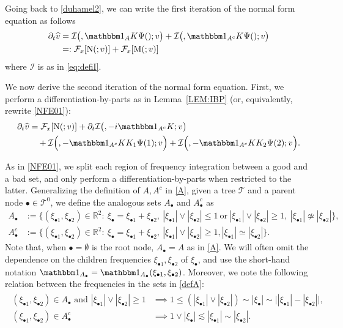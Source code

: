 \documentclass[%
11pt,  reqno]{amsart}
\makeatletter
\newcommand{\5}{\textup{V}}
\newcommand{\noi}{\noindent}
\newcommand{\ft}{\widehat}
\newcommand{\ind}{\mathbbm 1}
\newcommand{\les}{\lesssim}
\newcommand{\dt}{\partial_t}
\theoremstyle{remark}
\newcommand{\R}{\mathbb{R}}
\newcommand{\bul}{\bullet}
\newcommand{\TT}{\mathcal{T}}
\newcommand{\Ft}{{\mathcal{F}}}
\def\<#1>{\csname MH@symb@#1\endcsname}
\newcommand{\Ical}{\mathcal{I}}
\numberwithin{equation}{section}
\numberwithin{theorem}{section}
\newcommand{\MM}{\mathrm{M}}
\newcommand{\NN}{\mathrm{N}}
\makeatother
\begin{document}
Going back to \eqref{duhamel2}, we can write the first iteration of the normal form equation as follows
\begin{align}
\dt\ft v
&
= 
\Ical\big( \<1>, \ind_A K \Psi(\<1>); v 
\big)
+ \Ical\big( \<1>, \ind_{A^c} K \Psi(\<1>) ;v 
\big)
\\
&
=: \Ft_x[ \NN ( \<1>; v )] + \Ft_x[ \MM(\<1>; v) ] 
\label{NFE000}
\end{align}
where $\Ical$ is as in \eqref{eq:defiI}.

We now derive the second iteration of the normal form equation. 
First, we perform a differentiation-by-parts as in Lemma~\ref{LEM:IBP} (or, equivalently, rewrite \eqref{NFE01}):
\begin{align}
\label{NFE00}
\begin{split}
\dt\ft v 
&
=
 \Ft_x[ \NN ( \<1>; v )] 
+ 
\dt\Ical \big( \<1>,  - i \ind_{A^c} K; v \big) 
\\
&
\quad 
+
\Ical \Big( \<21>, - \ind_{A^c} KK_1\Psi(1) ; v  \Big) 
+
\Ical \Big( \<22>, - \ind_{A^c} KK_2\Psi(2) ; v  \Big) 
. 
\end{split}
\end{align}

\noi
As in \eqref{NFE01}, we split each region of frequency integration between a good and a bad set, and only perform a differentiation-by-parts when restricted to the latter. Generalizing the definition of $A, A^c$ in \eqref{A}, given a tree $\TT$ and a parent node $\bul \in \TT^0$, we define the analogous sets $A_\bul$ and $A_\bul^c$ as
\begin{align}
A_\bul& 
:=
 \big\{ (\xi_{\bul1}, \xi_{\bul2}) \in \R^2: \ \xi_\bul =
\xi_{\bul1}
+ \xi_{\bul2}, \ |\xi_{\bul1}| \lor  |\xi_{\bul2}|  \le 1 
\ \text{or}
\ |\xi_{\bul1}| \lor |\xi_{\bul2}| \ge 1,\
|\xi_{\bul1} | \not \simeq |\xi_{\bul2}| 
 \big\} , \\
A_\bul^c & := \big\{ (\xi_{\bul1}, \xi_{\bul2}) \in \R^2: \ \xi_\bul =
\xi_{\bul1} +
\xi_{\bul2},\
|\xi_{\bul1}| \lor |\xi_{\bul2}| \ge1
 , |\xi_{\bul1} |  \simeq |\xi_{\bul2}| 
\big\} 
.
\label{defA}
\end{align}
Note that, when $\bul = \emptyset$ is the root node, $A_\bul =A$ as in \eqref{A}. 
We will often omit the dependence on the children frequencies $\xi_{\bul 1}, \xi_{\bul2}$ of $\xi_\bul$, and use the short-hand notation $\ind_{A_\bul}=\ind_{A_\bul} (\xi_{\bul1},\xi_{\bul2})$.
Moreover, we note the following relation between the frequencies in the sets in \eqref{defA}:
\begin{align}
\label{defA2}
\begin{split}
(\xi_{\bul1}, \xi_{\bul2}) \in A_\bul \text{ and } 
|\xi_{\bul1}| \lor |\xi_{\bul2}| \ge 1
&
\implies 1 \le (|\xi_{\bul1}| \lor |\xi_{\bul2}|) \sim |\xi_\bul| \sim \big| | \xi_{\bul1}| - |\xi_{\bul2}| \big|
,
\\
(\xi_{\bul1}, \xi_{\bul2}) \in A_\bul^{c} 
&
\implies 1 \lor  |\xi_{\bul}|  \les |\xi_{\bul1}| \sim |\xi_{\bul2}|
.
\end{split}
\end{align}
\end{document}
